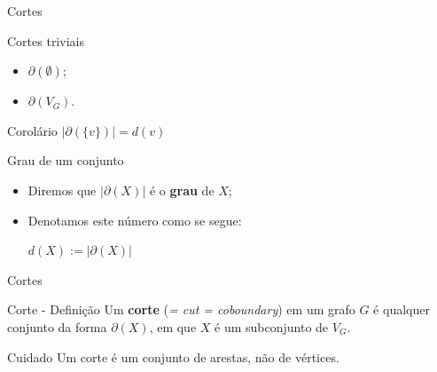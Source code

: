 \documentclass[xcolor=dvipsnames,table]{beamer}
\begin{document}
	\begin{frame}{Cortes}
		\begin{block}{Cortes triviais}
			\begin{itemize}
				\item $\partial( \emptyset )$; \pause
				\item $\partial( V_G )$.
			\end{itemize}
		\end{block} \pause
		\begin{block}{Corolário}
			$|\partial(\{v\})| = d(v)$
		\end{block} \pause
		\begin{block}{Grau de um conjunto}
			\begin{itemize}
				\item Diremos que $|\partial(X)|$ é o {\bf grau} de $X$; \pause
				\item Denotamos este número como se segue:
				\begin{center}
					$d(X) := |\partial(X)|$
				\end{center}
			\end{itemize}
		\end{block}
	\end{frame}
	
	\begin{frame}{Cortes}
		\begin{block}{Corte - Definição}
			Um {\bf corte} ({\it = cut = coboundary}) em um grafo $G$ é qualquer conjunto da forma $\partial(X)$, em que $X$ é um subconjunto de $V_G$.
		\end{block} \pause
		\begin{alertblock}{Cuidado}
			Um corte é um conjunto de arestas, não de vértices.
		\end{alertblock}
	\end{frame}
	
	\begin{frame}
		\titlepage
	\end{frame}
	
\end{document}
